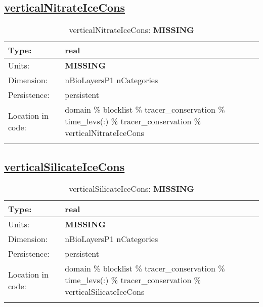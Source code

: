 \subsection[verticalNitrateIceCons]{\hyperref[sec:var_tab_tracer_conservation]{verticalNitrateIceCons}}
\label{subsec:var_sec_tracer_conservation_verticalNitrateIceCons}
\begin{center}
\begin{longtable}{| p{2.0in} | p{4.0in} |}
        \hline 
        Type: & real \\
        \hline 
        Units: & {\bf \color{red} MISSING} \\
        \hline 
        Dimension: & nBioLayersP1 nCategories \\
        \hline 
        Persistence: & persistent \\
        \hline 
         Location in code: & domain \% blocklist \% tracer\_conservation \% time\_levs(:) \% tracer\_conservation \% verticalNitrateIceCons \\
         \hline 
    \caption{verticalNitrateIceCons: {\bf \color{red} MISSING}}
\end{longtable}
\end{center}
\subsection[verticalSilicateIceCons]{\hyperref[sec:var_tab_tracer_conservation]{verticalSilicateIceCons}}
\label{subsec:var_sec_tracer_conservation_verticalSilicateIceCons}
\begin{center}
\begin{longtable}{| p{2.0in} | p{4.0in} |}
        \hline 
        Type: & real \\
        \hline 
        Units: & {\bf \color{red} MISSING} \\
        \hline 
        Dimension: & nBioLayersP1 nCategories \\
        \hline 
        Persistence: & persistent \\
        \hline 
         Location in code: & domain \% blocklist \% tracer\_conservation \% time\_levs(:) \% tracer\_conservation \% verticalSilicateIceCons \\
         \hline 
    \caption{verticalSilicateIceCons: {\bf \color{red} MISSING}}
\end{longtable}
\end{center}
